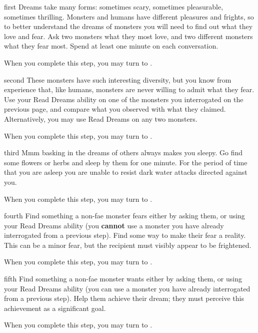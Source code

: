 \documentclass[notebook]{guildcamp2} %
\begin{document}
\startnotebook{\nDreams{}}

\begin{page}{first}
Dreams take many forms: sometimes scary, sometimes pleasurable, sometimes thrilling. Monsters and humans have different pleasures and frights, so to better understand the dreams of monsters you will need to find out what they love and fear. Ask two monsters what they most love, and two different monsters what they fear most. Spend at least one minute on each conversation.

When you complete this step, you may turn to .
\end{page}


\begin{page}{second}
These monsters have such interesting diversity, but you know from experience that, like humans, monsters are never willing to admit what they fear. Use your Read Dreams ability on one of the monsters you interrogated on the previous page, and compare what you observed with what they claimed. Alternatively, you may use Read Dreams on any two monsters.

When you complete this step, you may turn to .
\end{page}


\begin{page}{third}
Mmm basking in the dreams of others always makes you sleepy. Go find some flowers or herbs and sleep by them for one minute. For the period of time that you are asleep you are unable to resist dark water attacks directed against you.

When you complete this step, you may turn to .
\end{page}


\begin{page}{fourth}
Find something a non-fae monster fears either by asking them, or using your Read Dreams ability (you {\bf cannot} use a monster you have already interrogated from a previous step). Find some way to make their fear a reality. This can be a minor fear, but the recipient must visibly appear to be frightened.

When you complete this step, you may turn to .
\end{page}


\begin{page}{fifth}
Find something a non-fae monster wants either by asking them, or using your Read Dreams ability (you can use a monster you have already interrogated from a previous step). Help them achieve their dream; they must perceive this achievement as a significant goal.

When you complete this step, you may turn to .
\end{page}
\end{document}
